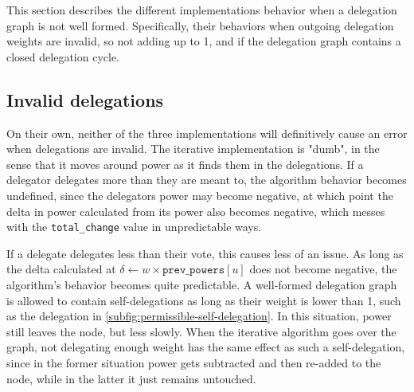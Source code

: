 This section describes the different implementations behavior when a delegation graph is not well formed. Specifically, their behaviors when outgoing delegation weights are invalid, so not adding up to 1, and if the delegation graph contains a closed delegation cycle. 

\subsection{Invalid delegations}

On their own, neither of the three implementations will definitively cause an error when delegations are invalid. The iterative implementation is "dumb", in the sense that it moves around power as it finds them in the delegations. If a delegator delegates more than they are meant to, the algorithm behavior becomes undefined, since the delegators power may become negative, at which point the delta in power calculated from its power also becomes negative, which messes with the \texttt{total\_change} value in unpredictable ways. 

If a delegate delegates less than their vote, this causes less of an issue. As long as the delta calculated at $\delta \gets w \times \texttt{prev\_powers}[u]$ does not become negative, the algorithm's behavior becomes quite predictable. A well-formed delegation graph is allowed to contain self-delegations as long as their weight is lower than 1, such as the delegation in \cref{subfig:permissible-self-delegation}. In this situation, power still leaves the node, but less slowly. When the iterative algorithm goes over the graph, not delegating enough weight has the same effect as such a self-delegation, since in the former situation  power gets subtracted and then re-added to the node, while in the latter it just remains untouched.

